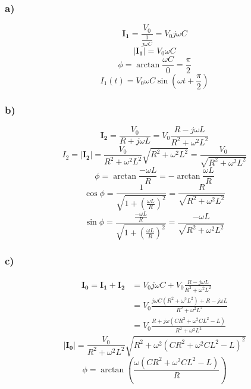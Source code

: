 \documentclass[../homework.tex]{subfiles}
\begin{document}
\subsubsection*{a)}
\begin{equation*}
    \mathbf{I_1} = \frac{V_0}{\frac{1}{j \omega C}} = V_0 j \omega C
\end{equation*}
\begin{equation*}
    |\mathbf{I_1}| = V_0 \omega C
\end{equation*}
\begin{equation*}
    \phi = \arctan \frac{\omega C}{0} = \frac{\pi}{2} 
\end{equation*}
\begin{equation*}
    I_1(t) = V_0 \omega C \sin{\left(\omega t + \frac{\pi}{2}\right)}
\end{equation*}

\subsubsection*{b)}
\begin{equation*}
    \mathbf{I_2} = \frac{V_0}{R + j \omega L} = V_0 \frac{R - j \omega L}{R^2 + \omega^2 L^2}
\end{equation*}
\begin{equation*}
    I_2 = |\mathbf{I_2}| = \frac{V_0}{R^2 + \omega^2 L^2} \sqrt{R^2 + \omega^2 L^2} = \frac{V_0}{\sqrt{R^2 + \omega^2 L^2}}
\end{equation*}
\begin{equation*}
    \phi = \arctan{\frac{-\omega L}{R}} = -\arctan{\frac{\omega L}{R}}
\end{equation*}
\begin{equation*}
    \cos{\phi} = \frac{1}{\sqrt{1 + \left(\frac{\omega L}{R}\right)^2}} = \frac{R}{\sqrt{R^2 + \omega^2 L^2}}
\end{equation*}
\begin{equation*}
    \sin{\phi} = \frac{\frac{-\omega L}{R}}{\sqrt{1 + \left(\frac{\omega L}{R}\right)^2}} = \frac{-\omega L}{\sqrt{R^2 + \omega^2 L^2}}
\end{equation*}

\subsubsection*{c)}
\begin{align*}
    \mathbf{I_0} = \mathbf{I_1 + I_2} &= V_0 j \omega C + V_0 \frac{R - j \omega L}{R^2 + \omega^2 L^2} \\
     &= V_0 \frac{j \omega C (R^2 + \omega^2 L^2) + R - j \omega L}{R^2 + \omega^2 L^2} \\
     &= V_0 \frac{R + j \omega (CR^2 + \omega^2 C L^2 - L)}{R^2 + \omega^2 L^2}
\end{align*}
\begin{equation*}
    |\mathbf{I_0}| = \frac{V_0}{R^2 + \omega^2 L^2} \sqrt{R^2 + \omega^2 (CR^2 + \omega^2 C L^2 - L)^2}
\end{equation*}
\begin{equation*}
    \phi = \arctan \left( \frac{\omega(CR^2 + \omega^2 C L^2 - L)}{R} \right)
\end{equation*}
\end{document}
